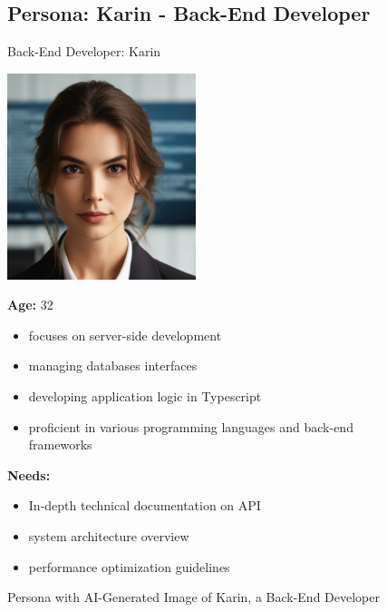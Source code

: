 \begin{figure}[h!]
\subsection*{Persona: Karin - Back-End Developer}
\begin{persona}{Back-End Developer: Karin}
\begin{tcbraster}[raster columns=2, raster column skip=5mm]
  \begin{tcolorbox}[width=0.2\linewidth, colback=white, colframe=white, boxrule=0pt, halign=center]
   \includegraphics[width=\linewidth, height=6cm, keepaspectratio]{Images/Karin.jpg}
  \end{tcolorbox}
  \begin{tcolorbox}[width=0.8\linewidth, colback=white, colframe=white, boxrule=0pt]
\fontsize{10pt}{9.6pt}\selectfont
    \textbf{Age:} 32\\
    \begin{itemize}
        \item focuses on server-side development
        \item managing databases interfaces
        \item developing application logic in Typescript
        \item proficient in various programming languages and back-end frameworks
    \end{itemize}
    \textbf{Needs:}
        \begin{itemize}
        \item In-depth technical documentation on \ac{API}
        \item system architecture overview
        \item performance optimization guidelines
    \end{itemize}
  \end{tcolorbox}
\end{tcbraster}
\end{persona}
\caption{Persona with \ac{AI}-Generated Image of Karin, a Back-End Developer}
\label{fig:persona:karin}
\end{figure}
\pagebreak




